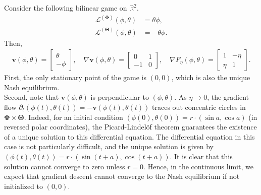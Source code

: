 \documentclass{article}
\renewcommand{\vec}[1]{\ensuremath{\boldsymbol{#1}}}
\newcommand{\ltheta}[0]{\ensuremath{\mathcal{L}^{(\boldsymbol{\Theta})}}}
\newcommand{\lphi}[0]{\ensuremath{\mathcal{L}^{(\boldsymbol{\Phi})}}}
\newcommand{\vecfield}{\vec{v}}
\begin{document}
\begin{eg}
    Consider the following bilinear game on $\mathbb{R}^2$. 
    \begin{align*}
        \lphi (\phi, \theta) &= \theta \phi, \nonumber \\
        \ltheta (\phi, \theta) &= -\theta \phi.
    \end{align*}
    Then, 
    \begin{align*}
        \vec{v} (\phi, \theta) = \begin{bmatrix}
            \theta \\
            -\phi
        \end{bmatrix},\quad
        \nabla \vec{v} (\phi, \theta) = \begin{bmatrix}
            0 & 1 \\
            -1 & 0
        \end{bmatrix},\quad
        \nabla F_\eta(\phi, \theta) = \begin{bmatrix}
            1 & -\eta \\
            \eta & 1
        \end{bmatrix}.
    \end{align*}
    First, the only stationary point of the game is $(0, 0)$, which is also the unique Nash equilibrium. \\
    
    Second, note that $\vecfield(\phi, \theta)$ is perpendicular to $(\phi, \theta)$. As $\eta \to 0$, the gradient flow $\partial_t (\phi(t), \theta(t)) = - \vecfield(\phi(t), \theta(t))$ traces out concentric circles in $\vec{\Phi} \times \vec{\Theta}$. Indeed, for an initial condition $(\phi(0), \theta(0)) = r\cdot  (\sin a, \cos a)$ (in reversed polar coordinates), the Picard-Lindelöf theorem guarantees the existence of a unique solution to this differential equation. The differential equation in this case is not particularly difficult, and the unique solution is given by $(\phi(t), \theta(t)) = r\cdot (\sin (t + a), \cos (t + a))$. It is clear that this solution cannot converge to zero unless $r = 0$. Hence, in the continuous limit, we expect that gradient descent cannot converge to the Nash equilibrium if not initialized to $(0, 0)$. \\
    

\end{eg}
\end{document}
